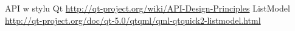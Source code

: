 \documentclass[11pt,twoside,a4paper,final]{article}
\begin{document}







\begin{thebibliography}{}

API w stylu Qt \url{http://qt-project.org/wiki/API-Design-Principles}
ListModel \url{http://qt-project.org/doc/qt-5.0/qtqml/qml-qtquick2-listmodel.html}

\end{thebibliography}
\end{document}
